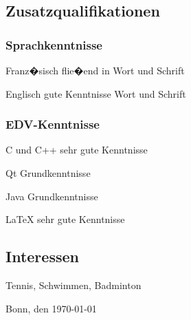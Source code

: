 \documentclass[a4papers]{scrartcl}
\begin{document}
\vspace{-2.5\baselineskip}
\subsection{Zusatzqualifikationen}

\subsubsection{Sprachkenntnisse}

\begin{list}{}
{\setlength{\topsep}{1.0cm}
\setlength{\itemsep}{0cm}
\setlength{\leftmargin}{3.6cm}
\setlength{\labelwidth}{3.2cm}
\setlength{\labelsep}{0.4cm}
\renewcommand{\makelabel}[1]{\fontfamily{cmss}\fontseries{x}\fontshape{n}
\selectfont #1}}
\item[Franz�sisch] flie�end in Wort und Schrift
\item[Englisch] gute Kenntnisse Wort und Schrift
\end{list}

\vspace{-2.5\baselineskip}
\subsubsection{EDV-Kenntnisse}

\begin{list}{}
{\setlength{\topsep}{1.0cm}
\setlength{\itemsep}{0cm}
\setlength{\leftmargin}{3.6cm}
\setlength{\labelwidth}{3.2cm}
\setlength{\labelsep}{0.4cm}
\renewcommand{\makelabel}[1]{\fontfamily{cmss}\fontseries{x}\fontshape{n}
\selectfont #1}}
\item[C und C++] sehr gute Kenntnisse
\item[Qt] Grundkenntnisse
\item[Java] Grundkenntnisse
\item[LaTeX] sehr gute Kenntnisse
\end{list}

\vspace{-2.5\baselineskip}
\subsection{Interessen}

\begin{list}{}
{\setlength{\topsep}{1.0cm}
\setlength{\itemsep}{0cm}
\setlength{\leftmargin}{3.6cm}
\setlength{\labelwidth}{3.2cm}
\setlength{\labelsep}{0.4cm}
\renewcommand{\makelabel}[1]{\fontfamily{cmss}\fontseries{x}\fontshape{n}
\selectfont #1}}
\item[] Tennis, Schwimmen, Badminton
\end{list}


\vspace{3cm}
Bonn, den \today
\end{document}
